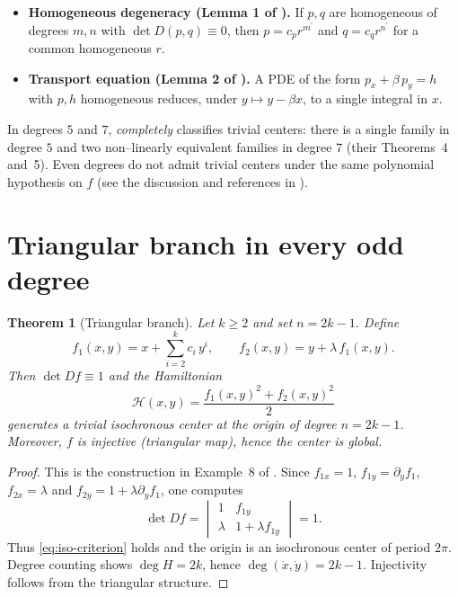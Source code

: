 \documentclass[11pt]{article}%
\theoremstyle{plain}
\newtheorem{theorem}{Theorem}[section]
\theoremstyle{definition}
\begin{document}
\begin{itemize}
\item \textbf{Homogeneous degeneracy (Lemma 1 of \cite{BraLliMer}).} If $p,q$
are homogeneous of degrees $m,n$ with $\det D(p,q)\equiv0$, then
$p=c_{p}r^{m^{\prime}}$ and $q=c_{q} r^{n^{\prime}}$ for a common homogeneous
$r $.

\item \textbf{Transport equation (Lemma 2 of \cite{BraLliMer}).} A PDE of the
form $p_{x}+\beta\,p_{y}=h$ with $p,h$ homogeneous reduces, under $y\mapsto
y-\beta x$, to a single integral in $x$.
\end{itemize}

In degrees $5$ and $7$, \cite{BraLliMer} \emph{completely} classifies trivial
centers: there is a single family in degree $5$ and two non--linearly
equivalent families in degree $7$ (their Theorems~4 and~5). Even degrees do
not admit trivial centers under the same polynomial hypothesis on $f$ (see the
discussion and references in \cite{BraLliMer}).

\section{Triangular branch in every odd degree}

\begin{theorem}
[Triangular branch]\label{thm:triangular} Let $k\geq2$ and set $n=2k-1$.
Define
\begin{equation}
f_{1}(x,y)=x+\sum_{i=2}^{k}c_{i}\,y^{i},\qquad f_{2}(x,y)=y+\lambda
\,f_{1}(x,y).\label{eq:triangular-f}%
\end{equation}
Then $\det Df\equiv1$ and the Hamiltonian
\[
\mathcal{H}(x,y)=\frac{f_{1}(x,y)^{2}+f_{2}(x,y)^{2}}{2}%
\]
generates a trivial isochronous center at the origin of degree $n=2k-1$.
Moreover, $f$ is injective (triangular map), hence the center is global.
\end{theorem}

\begin{proof}
This is the construction in Example~8 of \cite{BraLliMer}. Since $f_{1x}=1$, $f_{1y}=\partial_y f_1$, $f_{2x}=\lambda$ and $f_{2y}=1+\lambda \partial_y f_1$, one computes
\begin{equation*}
\det Df=\begin{vmatrix} 1 & f_{1y}\\ \lambda & 1+\lambda f_{1y}\end{vmatrix}=1.
\end{equation*}
Thus \eqref{eq:iso-criterion} holds and the origin is an isochronous center of period $2\pi$. Degree counting shows $\deg H=2k$, hence $\deg(\dot x,\dot y)=2k-1$. Injectivity follows from the triangular structure.
\end{proof}
\end{document}
